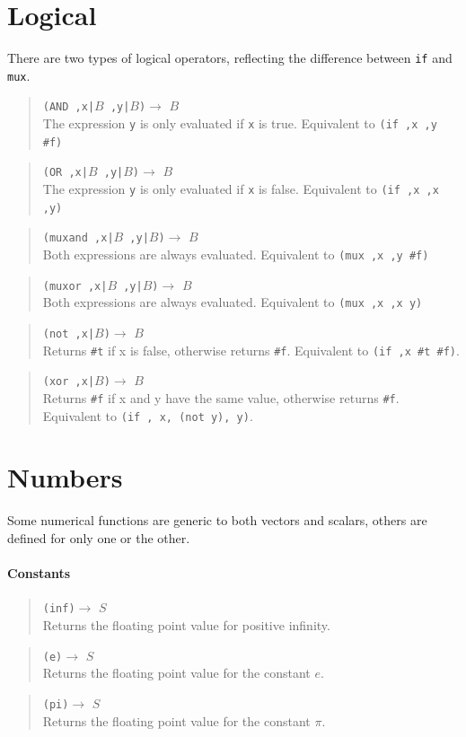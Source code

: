 \documentclass{article}
\newcommand\function[3]
{\begin{quote}{\tt #1}$\rightarrow$ \type{#2} \\ #3 \end{quote}}
\newcommand\type[1]{$#1$}
\newcommand\var[1]{{\tt #1}}
\begin{document}
\section{Logical}

There are two types of logical operators, reflecting the difference
between \var{if} and \var{mux}.

\function{(AND ,x|\type{B} ,y|\type{B})}{B}{The expression \var{y} is only 
  evaluated if \var{x} is true.  Equivalent to \var{(if ,x ,y \#f)}}
\function{(OR ,x|\type{B} ,y|\type{B})}{B}{The expression \var{y} is only 
  evaluated if \var{x} is false.  Equivalent to \var{(if ,x ,x ,y)}}
\function{(muxand ,x|\type{B} ,y|\type{B})}{B}{Both expressions are always
  evaluated.  Equivalent to \var{(mux ,x ,y \#f)}}
\function{(muxor ,x|\type{B} ,y|\type{B})}{B}{Both expressions are always
  evaluated.  Equivalent to \var{(mux ,x ,x y)}}

\function{(not ,x|\type{B})}{B}{Returns \var{\#t} if x is false, otherwise
  returns \var{\#f}.  Equivalent to \var{(if ,x \#t \#f)}.}
\function{(xor ,x|\type{B})}{B}{Returns \var{\#f} if x and y have the same value, otherwise
  returns \var{\#f}.  Equivalent to \var{(if , x, (not y), y)}.}
  

\section{Numbers}

Some numerical functions are generic to both vectors and scalars,
others are defined for only one or the other.

\paragraph{Constants}
\function{(inf)}{S}{Returns the floating point value for positive infinity.}
\function{(e)}{S}{Returns the floating point value for the constant $e$.}
\function{(pi)}{S}{Returns the floating point value for the constant $\pi$.}
\end{document}
